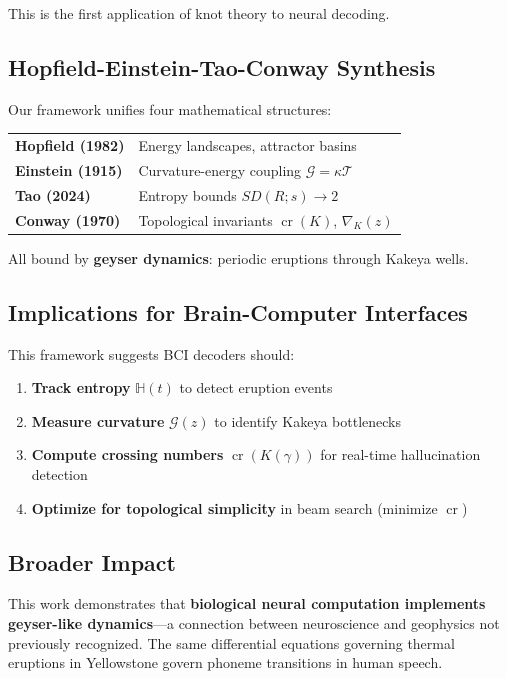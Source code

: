\documentclass[12pt]{article}
\begin{document}
This is the first application of knot theory to neural decoding.

\subsection{Hopfield-Einstein-Tao-Conway Synthesis}

Our framework unifies four mathematical structures:

\begin{center}
\begin{tabular}{ll}
\textbf{Hopfield (1982)} & Energy landscapes, attractor basins \\
\textbf{Einstein (1915)} & Curvature-energy coupling $\mathcal{G} = \kappa \mathcal{T}$ \\
\textbf{Tao (2024)} & Entropy bounds $SD(R;s) \to 2$ \\
\textbf{Conway (1970)} & Topological invariants $\operatorname{cr}(K)$, $\nabla_K(z)$ \\
\end{tabular}
\end{center}

All bound by \textbf{geyser dynamics}: periodic eruptions through Kakeya wells.

\subsection{Implications for Brain-Computer Interfaces}

This framework suggests BCI decoders should:

\begin{enumerate}
\item \textbf{Track entropy} $\mathbb{H}(t)$ to detect eruption events
\item \textbf{Measure curvature} $\mathcal{G}(z)$ to identify Kakeya bottlenecks
\item \textbf{Compute crossing numbers} $\operatorname{cr}(K(\gamma))$ for real-time hallucination detection
\item \textbf{Optimize for topological simplicity} in beam search (minimize $\operatorname{cr}$)
\end{enumerate}

\subsection{Broader Impact}

This work demonstrates that \textbf{biological neural computation implements geyser-like dynamics}---a connection between neuroscience and geophysics not previously recognized. The same differential equations governing thermal eruptions in Yellowstone govern phoneme transitions in human speech.
\end{document}
